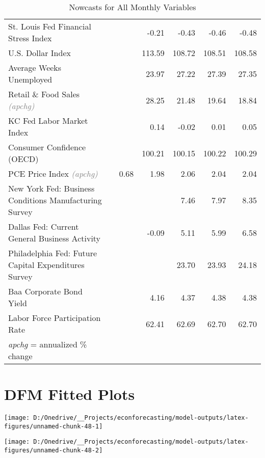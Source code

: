 \documentclass[11pt, letterpaper]{article}\usepackage[]{graphicx}\usepackage[]{color}
\begin{document}
\begin{table}[H]
\begin{tabular}{lrrrrrr}
  St. Louis Fed Financial Stress Index &  &  & -0.21 & -0.43 & -0.46 & -0.48 \\ 
  U.S. Dollar Index &  &  & 113.59 & 108.72 & 108.51 & 108.58 \\ 
  Average Weeks Unemployed &  &  & 23.97 & 27.22 & 27.39 & 27.35 \\ 
  Retail \& Food Sales \textit{\footnotesize\textcolor{gray}{(apchg)}} &  &  & 28.25 & 21.48 & 19.64 & 18.84 \\ 
  KC Fed Labor Market Index &  &  & 0.14 & -0.02 & 0.01 & 0.05 \\ 
  Consumer Confidence (OECD) &  &  & 100.21 & 100.15 & 100.22 & 100.29 \\ 
  PCE Price Index \textit{\footnotesize\textcolor{gray}{(apchg)}} &  & 0.68 & 1.98 & 2.06 & 2.04 & 2.04 \\ 
  New York Fed: Business Conditions Manufacturing Survey &  &  &  & 7.46 & 7.97 & 8.35 \\ 
  Dallas Fed: Current General Business Activity &  &  & -0.09 & 5.11 & 5.99 & 6.58 \\ 
  Philadelphia Fed: Future Capital Expenditures Survey &  &  &  & 23.70 & 23.93 & 24.18 \\ 
  Baa Corporate Bond Yield &  &  & 4.16 & 4.37 & 4.38 & 4.38 \\ 
  Labor Force Participation Rate &  &  & 62.41 & 62.69 & 62.70 & 62.70 \\ 
   \hline 
 \textit{apchg} = annualized \% change 
\end{tabular}
\endgroup
\caption{Nowcasts for All Monthly Variables} 
\end{table}



\appendix
\appendixpage
\addappheadtotoc

\section{DFM Fitted Plots}


{\centering \texttt{[image: D:/Onedrive/\_\_Projects/econforecasting/model-outputs/latex-figures/unnamed-chunk-48-1]} 

}




{\centering \texttt{[image: D:/Onedrive/\_\_Projects/econforecasting/model-outputs/latex-figures/unnamed-chunk-48-2]} 

}
\end{document}
